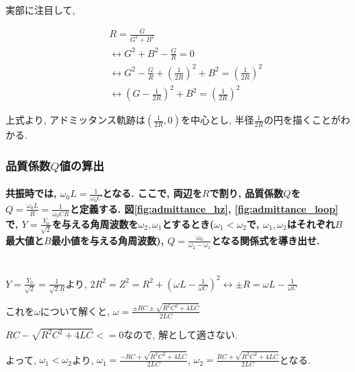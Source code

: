 \documentclass[titlepage]{jsarticle}
\begin{document}
                実部に注目して,
                
                \begin{eqnarray*}
                    &&R = \frac{G}{G^2 + B^2} \\
                    &&\leftrightarrow G^2 + B^2 - \frac{G}{R} = 0 \\
                    &&\leftrightarrow G^2 - \frac{G}{R} + \left(\frac{1}{2R}\right)^2 + B^2 = \left(\frac{1}{2R}\right)^2 \\
                    &&\leftrightarrow \left(G - \frac{1}{2R}\right)^2 + B^2 = \left(\frac{1}{2R}\right)^2
                \end{eqnarray*}

                上式より, アドミッタンス軌跡は$\displaystyle\left(\frac{1}{2R}, 0\right)$を中心とし,
                半径$\displaystyle \frac{1}{2R}$の円を描くことがわかる.

        \subsubsection{品質係数$Q$値の算出} \label{sssec:q}
            \paragraph{共振時では, $\displaystyle\omega_0L = \frac{1}{\omega_0C}$となる. ここで, 両辺を$R$で割り, 品質係数$Q$を$\displaystyle Q = \frac{\omega_0L}{R} = \frac{1}{\omega_0CR}$と定義する. 図\ref{fig:admittance_hz}, \ref{fig:admittance_loop}で, $\displaystyle Y = \frac{Y_0}{\sqrt{2}}$を与える角周波数を$\omega_2, \omega_1$とするとき($\omega_1 < \omega_2$で, $\omega_1, \omega_2$はそれぞれ$B$最大値と$B$最小値を与える角周波数), $\displaystyle Q = \frac{\omega_0}{\omega_2 - \omega_1}$となる関係式を導き出せ.}
            \mbox{} \\
                
                $\displaystyle Y = \frac{Y_0}{\sqrt{2}} = \frac{1}{\sqrt{2}R}$より,
                $\displaystyle 2R^2 = Z^2 = R^2 + (\omega L - \frac{1}{\omega C})^2 \leftrightarrow \pm R = \omega L - \frac{1}{\omega C}$

                これを$\omega$について解くと,
                $\displaystyle\omega = \frac{\pm RC \pm \sqrt{R^2C^2 + 4LC}}{2LC}$

                $RC - \sqrt{R^2C^2 + 4LC} <= 0$なので, 解として適さない.

                よって, $\omega_1 < \omega_2$より,
                $\displaystyle \omega_1 = \frac{-RC + \sqrt{R^2C^2 + 4LC}}{2LC}$,
                $\displaystyle \omega_2 = \frac{RC + \sqrt{R^2C^2 + 4LC}}{2LC}$となる.
\end{document}
